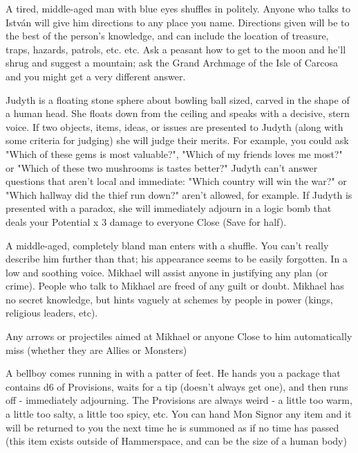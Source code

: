 
A tired, middle-aged man with blue eyes shuffles in politely.  Anyone who talks to István will give him directions to any place you name.  Directions given will be to the best of the person's knowledge, and can include the location of treasure, traps, hazards, patrols, etc. etc.  Ask a peasant how to get to the moon and he'll shrug and suggest a mountain; ask the Grand Archmage of the Isle of Carcosa and you might get a very different answer.  



Judyth is a floating stone sphere about bowling ball sized, carved in the shape of a human head.  She floats down from the ceiling and speaks with a decisive, stern voice.  If two objects, items, ideas, or issues are presented to Judyth (along with some criteria for judging) she will judge their merits. For example, you could ask "Which of these gems is most valuable?", "Which of my friends loves me most?" or "Which of these two mushrooms is tastes better?" Judyth can't answer questions that aren't local and immediate:  "Which country will win the war?" or "Which hallway did the thief run down?" aren't allowed, for example.  If Judyth is presented with a paradox, she will immediately adjourn in a logic bomb that deals your Potential x 3 damage to everyone Close (Save for half).


A middle-aged, completely bland man enters with a shuffle.  You can't really describe him further than that; his appearance seems to be easily forgotten.  In a low and soothing voice. Mikhael will assist anyone in justifying any plan (or crime).  People who talk to Mikhael are freed of any guilt or doubt.  Mikhael has no secret knowledge, but hints vaguely at schemes by people in power (kings, religious leaders, etc).  

Any arrows or projectiles aimed at Mikhael or anyone Close to him automatically miss (whether they are Allies or Monsters)



A bellboy comes running in with a patter of feet.  He hands you a package that contains d6 \UD of Provisions, waits for a tip (doesn't always get one), and then runs off - immediately adjourning.  The Provisions are always weird - a little too warm, a little too salty, a little too spicy, etc.  You can hand Mon Signor any item and it will be returned to you the next time he is summoned as if no time has passed (this item exists outside of Hammerspace, and can be the size of a human body)

